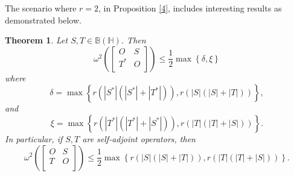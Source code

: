 \documentclass[12pt,twoside,reqno]{amsart}
\newtheorem{theorem}{Theorem}[section]
\numberwithin{equation}{section}
\begin{document}
The scenario where $r=2$, in Proposition \ref{4}, includes interesting results as demonstrated below.
\begin{theorem}\label{5}
Let $S, T\in \mathbb B\left( \mathbb H \right)$. Then
\[{{\omega }^{2}}\left( \left[ \begin{matrix}
   O & S  \\
   {{T}^{*}} & O  \\
\end{matrix} \right] \right)\le \frac{1}{2}\max \left\{ \delta ,\xi  \right\}\]
where
\[\delta =\max \left\{ r\left( \left| {{S}^{*}} \right|\left( \left| {{S}^{*}} \right|+\left| {{T}^{*}} \right| \right) \right),r\left( \left| S \right|\left( \left| S \right|+\left| T \right| \right) \right) \right\},\]
and
\[\xi =\max \left\{ r\left( \left| {{T}^{*}} \right|\left( \left| {{T}^{*}} \right|+\left| {{S}^{*}} \right| \right) \right),r\left( \left| T \right|\left( \left| T \right|+\left| S \right| \right) \right) \right\}.\]
In particular, if $S,T$ are self-adjoint operators, then
\[{{\omega }^{2}}\left( \left[ \begin{matrix}
   O & S  \\
   {{T}} & O  \\
\end{matrix} \right] \right)\le \frac{1}{2}\max \left\{ r\left( \left| S \right|\left( \left| S \right|+\left| T \right| \right) \right),r\left( \left| T \right|\left( \left| T \right|+\left| S \right| \right) \right) \right\}.\]
\end{theorem}
\end{document}
